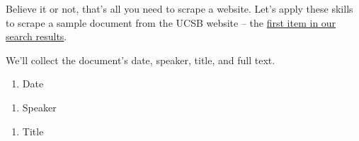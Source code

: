 \documentclass[]{book}
\newenvironment{Shaded}{\begin{snugshade}}{\end{snugshade}}
\newcommand{\CommentTok}[1]{\textcolor[rgb]{0.56,0.35,0.01}{\textit{#1}}}
\newcommand{\KeywordTok}[1]{\textcolor[rgb]{0.13,0.29,0.53}{\textbf{#1}}}
\newcommand{\NormalTok}[1]{#1}
\newcommand{\OperatorTok}[1]{\textcolor[rgb]{0.81,0.36,0.00}{\textbf{#1}}}
\newcommand{\StringTok}[1]{\textcolor[rgb]{0.31,0.60,0.02}{#1}}
\providecommand{\tightlist}{%
  \setlength{\itemsep}{0pt}\setlength{\parskip}{0pt}}
\begin{document}
Believe it or not, that's all you need to scrape a website. Let's apply these skills to scrape a sample document from the UCSB website -- the \href{\%22http://www.presidency.ucsb.edu/documents/letter-t-keith-glennan-administrator-national-aeronautics-and-space-administration\%22}{first item in our search results}.

We'll collect the document's date, speaker, title, and full text.

\begin{enumerate}
\def\labelenumi{\arabic{enumi}.}
\tightlist
\item
  Date
\end{enumerate}

\begin{Shaded}
\end{Shaded}

\begin{enumerate}
\def\labelenumi{\arabic{enumi}.}
\setcounter{enumi}{1}
\tightlist
\item
  Speaker
\end{enumerate}

\begin{Shaded}
\end{Shaded}

\begin{enumerate}
\def\labelenumi{\arabic{enumi}.}
\setcounter{enumi}{2}
\tightlist
\item
  Title
\end{enumerate}
\end{document}
